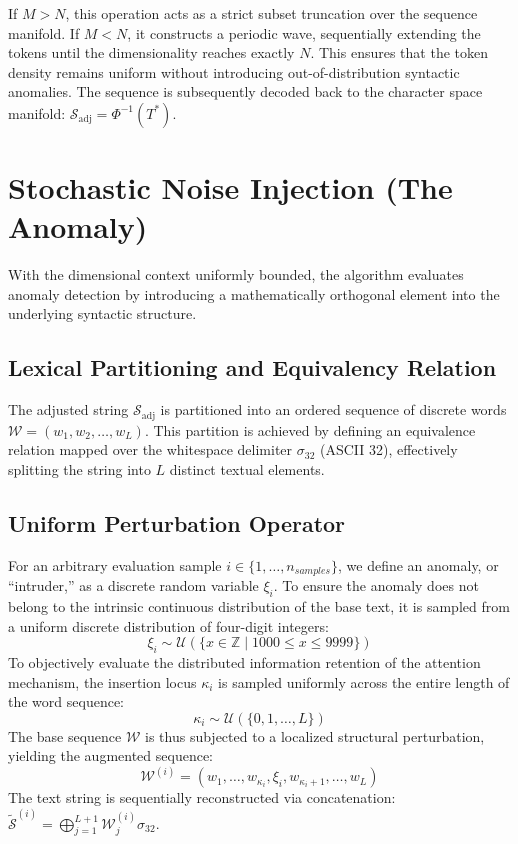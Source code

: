 \documentclass[11pt,a4paper]{article}
\newcommand{\Z}{\mathbb{Z}}
\newcommand{\U}{\mathcal{U}}
\begin{document}
If $M > N$, this operation acts as a strict subset truncation over the sequence manifold. If $M < N$, it constructs a periodic wave, sequentially extending the tokens until the dimensionality reaches exactly $N$. This ensures that the token density remains uniform without introducing out-of-distribution syntactic anomalies. The sequence is subsequently decoded back to the character space manifold: $\mathcal{S}_{\text{adj}} = \Phi^{-1}(T^*)$.

\section{Stochastic Noise Injection (The Anomaly)}
With the dimensional context uniformly bounded, the algorithm evaluates anomaly detection by introducing a mathematically orthogonal element into the underlying syntactic structure.

\subsection{Lexical Partitioning and Equivalency Relation}
The adjusted string $\mathcal{S}_{\text{adj}}$ is partitioned into an ordered sequence of discrete words $\mathcal{W} = (w_1, w_2, \dots, w_L)$. This partition is achieved by defining an equivalence relation mapped over the whitespace delimiter $\sigma_{32}$ (ASCII 32), effectively splitting the string into $L$ distinct textual elements.

\subsection{Uniform Perturbation Operator}
For an arbitrary evaluation sample $i \in \{1, \dots, n_{samples}\}$, we define an anomaly, or ``intruder,'' as a discrete random variable $\xi_i$. To ensure the anomaly does not belong to the intrinsic continuous distribution of the base text, it is sampled from a uniform discrete distribution of four-digit integers:
\begin{equation}
\xi_i \sim \U(\{x \in \Z \mid 1000 \le x \le 9999\})
\end{equation}
To objectively evaluate the distributed information retention of the attention mechanism, the insertion locus $\kappa_i$ is sampled uniformly across the entire length of the word sequence:
\begin{equation}
\kappa_i \sim \U(\{0, 1, \dots, L\})
\end{equation}
The base sequence $\mathcal{W}$ is thus subjected to a localized structural perturbation, yielding the augmented sequence:
\begin{equation}
\mathcal{W}^{(i)} = \left( w_1, \dots, w_{\kappa_i}, \xi_i, w_{\kappa_i+1}, \dots, w_L \right)
\end{equation}
The text string is sequentially reconstructed via concatenation: $\tilde{\mathcal{S}}^{(i)} = \bigoplus_{j=1}^{L+1} \mathcal{W}^{(i)}_j \sigma_{32}$.
\end{document}
